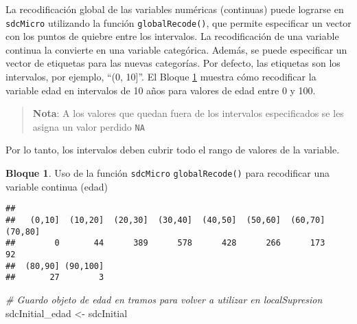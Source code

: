 \documentclass[
]{book}
\newenvironment{Shaded}{\begin{snugshade}}{\end{snugshade}}
\newcommand{\AttributeTok}[1]{\textcolor[rgb]{0.77,0.63,0.00}{#1}}
\newcommand{\CommentTok}[1]{\textcolor[rgb]{0.56,0.35,0.01}{\textit{#1}}}
\newcommand{\DecValTok}[1]{\textcolor[rgb]{0.00,0.00,0.81}{#1}}
\newcommand{\FunctionTok}[1]{\textcolor[rgb]{0.00,0.00,0.00}{#1}}
\newcommand{\NormalTok}[1]{#1}
\newcommand{\OtherTok}[1]{\textcolor[rgb]{0.56,0.35,0.01}{#1}}
\newcommand{\SpecialCharTok}[1]{\textcolor[rgb]{0.00,0.00,0.00}{#1}}
\newcommand{\StringTok}[1]{\textcolor[rgb]{0.31,0.60,0.02}{#1}}
\theoremstyle{definition}
\theoremstyle{definition}
\newtheorem{example}{Bloque}[chapter]
\theoremstyle{definition}
\theoremstyle{definition}
\theoremstyle{remark}
\begin{document}
La recodificación global de las variables numéricas (continuas) puede lograrse en \texttt{sdcMicro} utilizando la función \texttt{globalRecode()}, que permite especificar un vector con los puntos de quiebre entre los intervalos. La recodificación de una variable continua la convierte en una variable categórica. Además, se puede especificar un vector de etiquetas para las nuevas categorías. Por defecto, las etiquetas son los intervalos, por ejemplo, ``(0, 10{]}''. El Bloque \ref{exm:bloque16jgm} muestra cómo recodificar la variable edad en intervalos de 10 años para valores de edad entre 0 y 100.

\begin{quote}
\textbf{Nota}: A los valores que quedan fuera de los intervalos especificados se les asigna un valor perdido \texttt{NA}
\end{quote}

Por lo tanto, los intervalos deben cubrir todo el rango de valores de la variable.

\begin{example}
\protect\hypertarget{exm:bloque16jgm}{}\label{exm:bloque16jgm}Uso de la función \texttt{sdcMicro} \texttt{globalRecode()} para recodificar una variable continua (edad)
\end{example}

\begin{Shaded}
\end{Shaded}

\begin{verbatim}
## 
##   (0,10]  (10,20]  (20,30]  (30,40]  (40,50]  (50,60]  (60,70]  (70,80] 
##        0       44      389      578      428      266      173       92 
##  (80,90] (90,100] 
##       27        3
\end{verbatim}

\begin{Shaded}
\begin{Highlighting}[]
\CommentTok{\# Guardo objeto de edad en tramos para volver a utilizar en localSupresion}
\NormalTok{sdcInitial\_edad }\OtherTok{\textless{}{-}}\NormalTok{ sdcInitial}
\end{Highlighting}
\end{Shaded}
\end{document}
